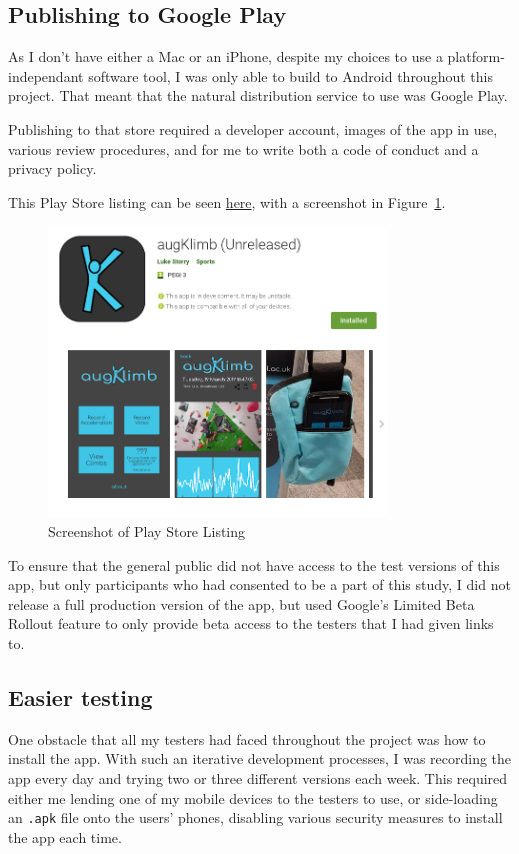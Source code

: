 \subsection{Publishing to Google Play}
As I don't have either a Mac or an iPhone, despite my choices to use a platform-independant software tool, I was only able to build to Android throughout this project.
That meant that the natural distribution service to use was Google Play.

Publishing to that store required a developer account, images of the app in use, various review procedures, and for me to write both a code of conduct and a privacy policy.

This Play Store listing can be seen \href{https://play.google.com/store/apps/details?id=com.lukestorry.augKlimb}{here}, with a screenshot in Figure~\ref{fig:playstore}.


\begin{figure}[h]
\centering
\includegraphics[width=9cm]{imgs/playstorescreenshot}
\caption{Screenshot of Play Store Listing}
\label{fig:playstore}
\end{figure}

To ensure that the general public did not have access to the test versions of this app, but only participants who had consented to be a part of this study, I did not release a full production version of the app, but used Google's Limited Beta Rollout feature to only provide beta access to the testers that I had given links to.


\subsection{Easier testing}
One obstacle that all my testers had faced throughout the project was how to install the app.
With such an iterative development processes, I was recording the app every day and trying two or three different versions each week.
This required either me lending one of my mobile devices to the testers to use, or side-loading an \verb|.apk| file onto the users' phones, disabling various security measures to install the app each time.

